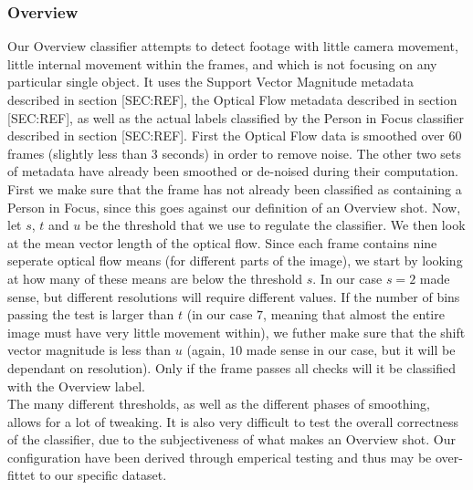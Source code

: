 \subsubsection{Overview}
%
%
%
Our Overview classifier attempts to detect footage with little camera movement, little internal movement within the frames, and which is not focusing on any particular single object.
%
%
It uses the Support Vector Magnitude metadata described in section [SEC:REF], the Optical Flow metadata described in section [SEC:REF], as well as the actual labels classified by the Person in Focus classifier described in section [SEC:REF]. First the Optical Flow data is smoothed over 60 frames (slightly less than 3 seconds) in order to remove noise. The other two sets of metadata have already been smoothed or de-noised during their computation.\\
%
%
First we make sure that the frame has not already been classified as containing a Person in Focus, since this goes against our definition of an Overview shot. Now, let $s$, $t$ and $u$ be the threshold that we use to regulate the classifier. We then look at the mean vector length of the optical flow. Since each frame contains nine seperate optical flow means (for different parts of the image), we start by looking at how many of these means are below the threshold $s$. In our case $s=2$ made sense, but different resolutions will require different values. If the number of bins passing the test is larger than $t$ (in our case $7$, meaning that almost the entire image must have very little movement within), we futher make sure that the shift vector magnitude is less than $u$ (again, $10$ made sense in our case, but it will be dependant on resolution).
%
%
Only if the frame passes all checks will it be classified with the Overview label.\\
The many different thresholds, as well as the different phases of smoothing, allows for a lot of tweaking. It is also very difficult to test the overall correctness of the classifier, due to the subjectiveness of what makes an Overview shot. Our configuration have been derived through emperical testing and thus may be over-fittet to our specific dataset.
%
